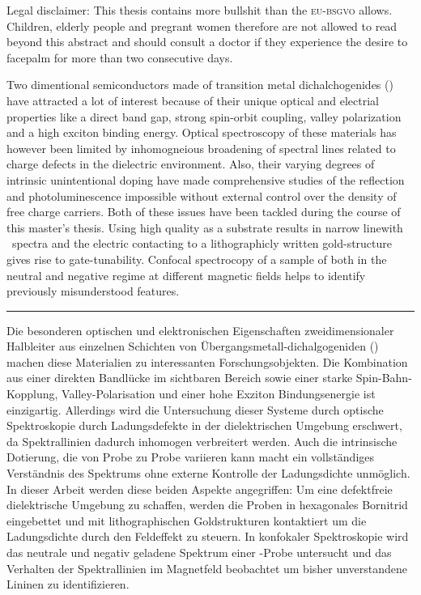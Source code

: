 Legal disclaimer: This thesis contains more bullshit than the \textsc{eu-bsgvo} allows. Children, elderly people and pregrant women therefore are not allowed to read beyond this abstract and should consult a doctor if they experience the desire to facepalm for more than two consecutive days.\newline

Two dimentional semiconductors made of transition metal dichalchogenides (\tmds\!) have attracted a lot of interest because of their unique optical and electrial properties like a direct band gap, strong spin-orbit coupling, valley polarization and a high exciton binding energy. Optical spectroscopy of these materials has however been limited by inhomogneious broadening of spectral lines related to charge defects in the dielectric environment. Also, their varying degrees of intrinsic unintentional doping have made comprehensive studies of the reflection and photoluminescence impossible without external control over the density of free charge carriers. Both of these issues have been tackled during the course of this master's thesis. Using high quality \hbng as a substrate results in narrow linewith \pl\ spectra and the electric contacting to a lithographicly written gold-structure gives rise to gate-tunability. Confocal spectrocopy of a sample of \wse both in the neutral and negative regime at different magnetic fields helps to identify previously misunderstood features.\newline
\begin{center}
\par\rule{0.7\textwidth}{1pt}
\end{center}
Die besonderen optischen und elektronischen Eigenschaften zweidimensionaler Halbleiter aus einzelnen Schichten von Übergangsmetall-dichalgogeniden (\tdmds\!) machen diese Materialien zu interessanten Forschungsobjekten. Die Kombination aus einer direkten Bandlücke im sichtbaren Bereich sowie einer starke Spin-Bahn-Kopplung, Valley-Polarisation und einer hohe Exziton Bindungsenergie ist einzigartig. Allerdings wird die Untersuchung dieser Systeme durch optische Spektroskopie durch Ladungsdefekte in der dielektrischen Umgebung erschwert, da Spektrallinien dadurch inhomogen verbreitert werden. Auch die intrinsische Dotierung, die von Probe zu Probe variieren kann macht ein vollständiges Verständnis des Spektrums ohne externe Kontrolle der Ladungsdichte unmöglich. In dieser Arbeit werden diese beiden Aspekte angegriffen: Um eine defektfreie dielektrische Umgebung zu schaffen, werden die Proben in hexagonales Bornitrid eingebettet und mit lithographischen Goldstrukturen kontaktiert um die Ladungsdichte durch den Feldeffekt zu steuern. In konfokaler Spektroskopie wird das neutrale und negativ geladene Spektrum einer \wse\!-Probe untersucht und das Verhalten der Spektrallinien im Magnetfeld beobachtet um bisher unverstandene Lininen zu identifizieren.